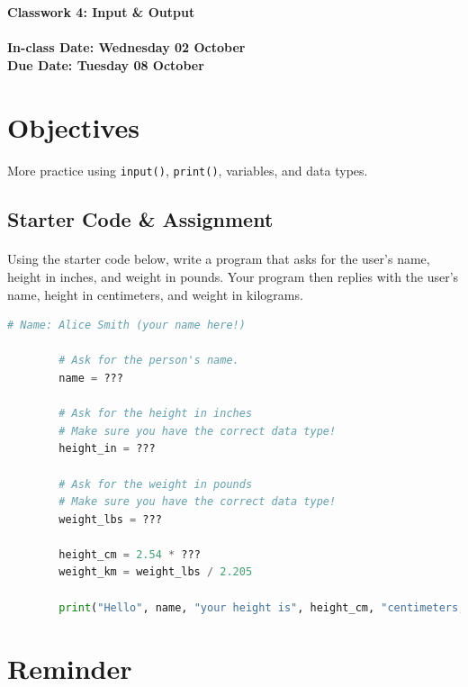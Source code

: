 \documentclass[letter,10pt]{article}
\begin{document}
    
    \huge
    \textbf{Classwork 4: Input \& Output}
    \normalsize
    \\ ~~ \\
    \textbf{In-class Date: Wednesday 02 October} \\
    \textbf{Due Date: Tuesday 08 October}
    
    \section*{Objectives}
    \paragraph{}More practice using \texttt{input()}, \texttt{print()}, variables, and data types.
    
    \subsection*{Starter Code \& Assignment}
    \paragraph{}Using the starter code below, write a program that asks for the user's name, height in inches, and weight in pounds. Your program then replies with the user's name, height in centimeters, and weight in kilograms.
    
    \begin{lstlisting}[language=python]
        # Name: Alice Smith (your name here!)
        
        # Ask for the person's name.
        name = ???
        
        # Ask for the height in inches
        # Make sure you have the correct data type!
        height_in = ???
        
        # Ask for the weight in pounds
        # Make sure you have the correct data type!
        weight_lbs = ???
        
        height_cm = 2.54 * ???
        weight_km = weight_lbs / 2.205
        
        print("Hello", name, "your height is", height_cm, "centimeters, and you weigh", weight_km, "kilograms.")
    \end{lstlisting}
    
    \section*{Reminder}
\end{document}
